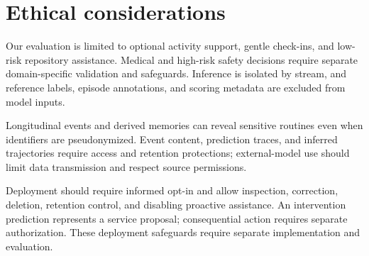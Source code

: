 \section*{Ethical considerations}

Our evaluation is limited to optional activity support, gentle check-ins, and low-risk repository assistance.
Medical and high-risk safety decisions require separate domain-specific validation and safeguards.
Inference is isolated by stream, and reference labels, episode annotations, and scoring metadata are excluded from model inputs.

Longitudinal events and derived memories can reveal sensitive routines even when identifiers are pseudonymized.
Event content, prediction traces, and inferred trajectories require access and retention protections; external-model use should limit data transmission and respect source permissions.

Deployment should require informed opt-in and allow inspection, correction, deletion, retention control, and disabling proactive assistance.
An intervention prediction represents a service proposal; consequential action requires separate authorization.
These deployment safeguards require separate implementation and evaluation.
